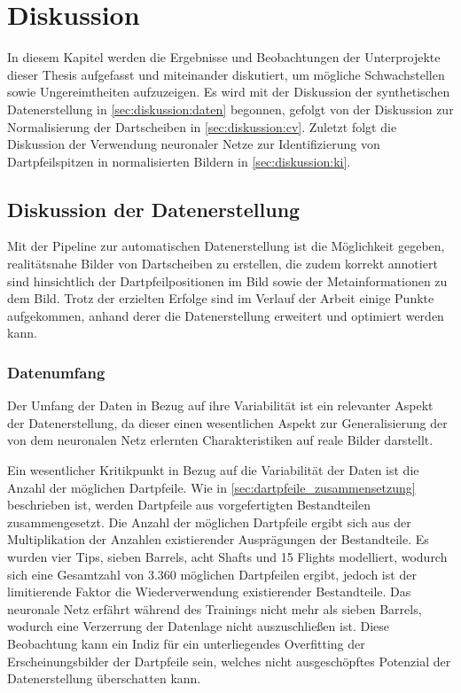 
\chapter{Diskussion}
\label{cha:diskussion}

In diesem Kapitel werden die Ergebnisse und Beobachtungen der Unterprojekte dieser Thesis aufgefasst und miteinander diskutiert, um mögliche Schwachstellen sowie Ungereimtheiten aufzuzeigen. Es wird mit der Diskussion der synthetischen Datenerstellung in \autoref{sec:diskussion:daten} begonnen, gefolgt von der Diskussion zur Normalisierung der Dartscheiben in \autoref{sec:diskussion:cv}. Zuletzt folgt die Diskussion der Verwendung neuronaler Netze zur Identifizierung von Dartpfeilspitzen in normalisierten Bildern in \autoref{sec:diskussion:ki}.


\section{Diskussion der Datenerstellung}
\label{sec:diskussion:daten}

Mit der Pipeline zur automatischen Datenerstellung ist die Möglichkeit gegeben, realitätsnahe Bilder von Dartscheiben zu erstellen, die zudem korrekt annotiert sind hinsichtlich der Dartpfeilpositionen im Bild sowie der Metainformationen zu dem Bild. Trotz der erzielten Erfolge sind im Verlauf der Arbeit einige Punkte aufgekommen, anhand derer die Datenerstellung erweitert und optimiert werden kann.

\subsection{Datenumfang}

Der Umfang der Daten in Bezug auf ihre Variabilität ist ein relevanter Aspekt der Datenerstellung, da dieser einen wesentlichen Aspekt zur Generalisierung der von dem neuronalen Netz erlernten Charakteristiken auf reale Bilder darstellt.

Ein wesentlicher Kritikpunkt in Bezug auf die Variabilität der Daten ist die Anzahl der möglichen Dartpfeile. Wie in \autoref{sec:dartpfeile_zusammensetzung} beschrieben ist, werden Dartpfeile aus vorgefertigten Bestandteilen zusammengesetzt. Die Anzahl der möglichen Dartpfeile ergibt sich aus der Multiplikation der Anzahlen existierender Ausprägungen der Bestandteile. Es wurden vier Tips, sieben Barrels, acht Shafts und 15 Flights modelliert, wodurch sich eine Gesamtzahl von $3.360$ möglichen Dartpfeilen ergibt, jedoch ist der limitierende Faktor die Wiederverwendung existierender Bestandteile. Das neuronale Netz erfährt während des Trainings nicht mehr als sieben Barrels, wodurch eine Verzerrung der Datenlage nicht auszuschließen ist. Diese Beobachtung kann ein Indiz für ein unterliegendes Overfitting der Erscheinungsbilder der Dartpfeile sein, welches nicht ausgeschöpftes Potenzial der Datenerstellung überschatten kann.

